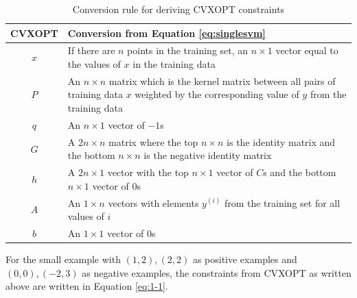 \documentclass[10pt]{article}
\begin{document}
\begin{table}[!ht]
\centering
\begin{tabular}{c|p{}}
	CVXOPT& Conversion from Equation \ref{eq:singlesvm} \\ \hline
	$x$ & If there are $n$ points in the training set, an $n \times 1$ vector equal to the values of $x$ in the training data \\
	$P$ & An $n \times n$ matrix which is the kernel matrix between all pairs of training data $x$ weighted by the corresponding value of $y$ from the training data \\
	$q$ & An $n \times 1$ vector of $-1$s \\
	$G$ & A $2n \times n$ matrix where the top $n \times n$ is the identity matrix and the bottom $n \times n$ is the negative identity matrix \\
	$h$ & A $2n \times 1$ vector with the top $n \times 1$ vector of $C$s and the bottom $n \times 1$ vector of $0$s \\
	$A$ & An $1 \times n$ vectors with elements $y^{(i)}$ from the training set for all values of $i$ \\
	$b$ & An $1 \times 1$ vector of $0$s
\end{tabular}
\caption{Conversion rule for deriving CVXOPT constraints}
\label{tbl:cvxopttosvm}
\end{table}

For the small example with $(1,2),(2,2)$ as positive examples and $(0,0),(-2,3)$ as negative examples, the constraints from CVXOPT as written above are written in Equation \ref{eq:1-1}.
\end{document}
